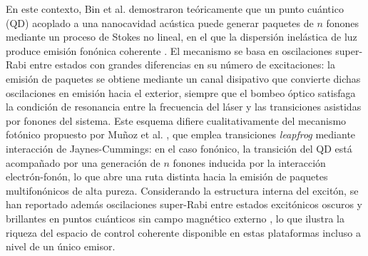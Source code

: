 En este contexto, Bin et al. demostraron teóricamente que un punto cuántico (QD) acoplado a una nanocavidad acústica puede generar paquetes de $n$ fonones mediante un proceso de Stokes no lineal, en el que la dispersión inelástica de luz produce emisión fonónica coherente \cite{bin2020}. El mecanismo se basa en oscilaciones super-Rabi \cite{strekalov2014} entre estados con grandes diferencias en su número de excitaciones: la emisión de paquetes se obtiene mediante un canal disipativo que convierte dichas oscilaciones en emisión hacia el exterior, siempre que el bombeo óptico satisfaga la condición de resonancia entre la frecuencia del láser y las transiciones asistidas por fonones del sistema. Este esquema difiere cualitativamente del mecanismo fotónico propuesto por Muñoz et al. \cite{munoz2014}, que emplea transiciones \textit{leapfrog} mediante interacción de Jaynes-Cummings: en el caso fonónico, la transición del QD está acompañado por una generación de $n$ fonones inducida por la interacción electrón-fonón, lo que abre una ruta distinta hacia la emisión de paquetes multifonónicos de alta pureza. Considerando la estructura interna del excitón, se han reportado además oscilaciones super-Rabi entre estados excitónicos oscuros y brillantes en puntos cuánticos sin campo magnético externo \cite{vargas2022}, lo que ilustra la riqueza del espacio de control coherente disponible en estas plataformas incluso a nivel de un único emisor.\\

